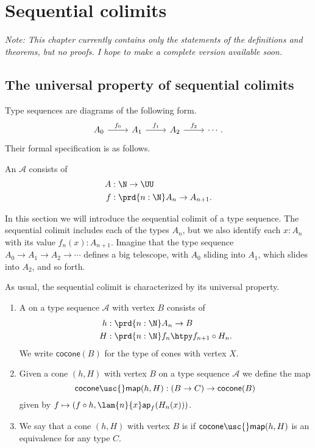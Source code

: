 \chapter{Sequential colimits}

\emph{Note: This chapter currently contains only the statements of the definitions and theorems, but no proofs. I hope to make a complete version available soon.}

\section{The universal property of sequential colimits}

Type sequences are diagrams of the following form.
\begin{equation*}
\begin{tikzcd}
A_0 \arrow[r,"f_0"] & A_1 \arrow[r,"f_1"] & A_2 \arrow[r,"f_2"] & \cdots.
\end{tikzcd}
\end{equation*}
Their formal specification is as follows.

\begin{defn}
An  $\mathcal{A}$ consists of
\begin{align*}
A & : \N\to\UU \\
f & : \prd{n:\N} A_n\to A_{n+1}. 
\end{align*}
\end{defn}

In this section we will introduce the sequential colimit of a type sequence.
The sequential colimit includes each of the types $A_n$, but we also identify each $x:A_n$ with its value $f_n(x):A_{n+1}$. 
Imagine that the type sequence $A_0\to A_1\to A_2\to\cdots$ defines a big telescope, with $A_0$ sliding into $A_1$, which slides into $A_2$, and so forth.

As usual, the sequential colimit is characterized by its universal property.

\begin{defn}
\begin{enumerate}
\item A  on a type sequence $\mathcal{A}$ with vertex $B$ consists of
\begin{align*}
h & : \prd{n:\N} A_n\to B \\
H & : \prd{n:\N} f_n\htpy f_{n+1}\circ H_n.
\end{align*}
We write $\mathsf{cocone}(B)$ for the type of cones with vertex $X$.
\item Given a cone $(h,H)$ with vertex $B$ on a type sequence $\mathcal{A}$ we define the map
\begin{equation*}
\mathsf{cocone\usc{}map}(h,H) : (B\to C)\to \mathsf{cocone}(B)
\end{equation*}
given by $f\mapsto (f\circ h,\lam{n}{x}\mathsf{ap}_f(H_n(x)))$. 
\item We say that a cone $(h,H)$ with vertex $B$ is  if $\mathsf{cocone\usc{}map}(h,H)$ is an equivalence for any type $C$. 
\end{enumerate}
\end{defn}

